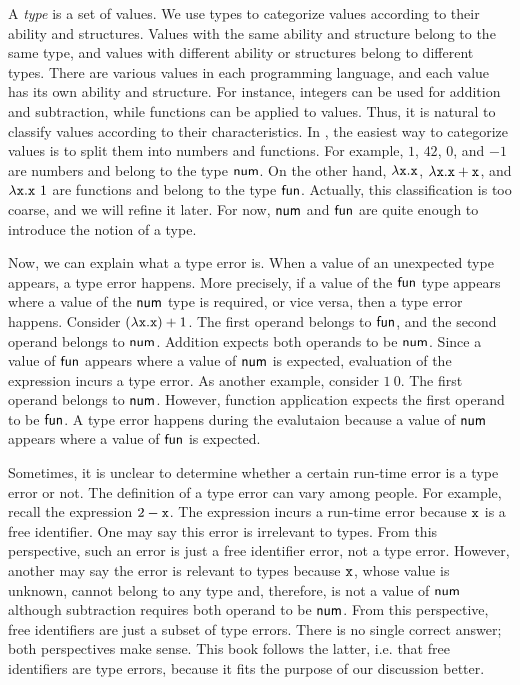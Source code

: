 A \textit{type}
is a set of values. We use types to categorize values according to their
ability and structures. Values with the same ability and structure belong to the
same type, and values with different ability or structures belong to different
types. There are various values in each programming language, and each value has its
own ability and structure. For instance, integers can be used for addition and
subtraction, while functions can be applied to values. Thus, it is natural to
classify values according to their characteristics. In \lang, the easiest way to
categorize values is to split them into numbers and functions. For example, $1$,
$42$, $0$, and $-1$ are numbers and belong to the type $\textsf{num}$.
On the other hand, $\lambda \texttt{x}.\texttt{x}$, $\lambda \texttt{x}.\texttt{x}+\texttt{x}$, and $\lambda \texttt{x}.\texttt{x}\ 1$
are functions and belong to the type $\textsf{fun}$. Actually, this classification is
too coarse, and we will refine it later. For now, $\textsf{num}$ and $\textsf{fun}$ are quite
enough to introduce the notion of a type.

Now, we can explain what a type error is. When a value of an unexpected type
appears, a type error happens. More precisely, if a value of the $\textsf{fun}$ type
appears where a value of the $\textsf{num}$ type is required, or vice versa, then a
type error happens. Consider $(\lambda \texttt{x}.\texttt{x})+1$. The first operand belongs
to $\textsf{fun}$, and the second operand belongs to $\textsf{num}$. Addition expects both
operands to be $\textsf{num}$. Since a value of $\textsf{fun}$ appears where a value of
$\textsf{num}$ is expected, evaluation of the expression incurs a type error.
As another example, consider $1\ 0$. The first operand belongs to $\textsf{num}$.
However, function application expects the first operand to be $\textsf{fun}$. A type
error happens during the evalutaion because a value of $\textsf{num}$ appears where a
value of $\textsf{fun}$ is expected.

Sometimes, it is unclear to determine whether a certain run-time error is a type error
or not. The definition of a type error can vary among people. For example,
recall the expression $2-\texttt{x}$. The expression incurs a run-time error because
$\texttt{x}$ is a free identifier. One may say this error is irrelevant to types. From
this perspective, such an error is just a free identifier error, not a type
error. However, another may say the error is relevant to types because
$\texttt{x}$, whose value is unknown, cannot belong to any type and, therefore, is not a
value of $\textsf{num}$ although subtraction requires both operand to be $\textsf{num}$.
From this perspective, free identifiers are just a subset of type errors. There is
no single correct answer; both perspectives make sense. This book follows the
latter, i.e. that free identifiers are type errors, because it fits the purpose
of our discussion better.

